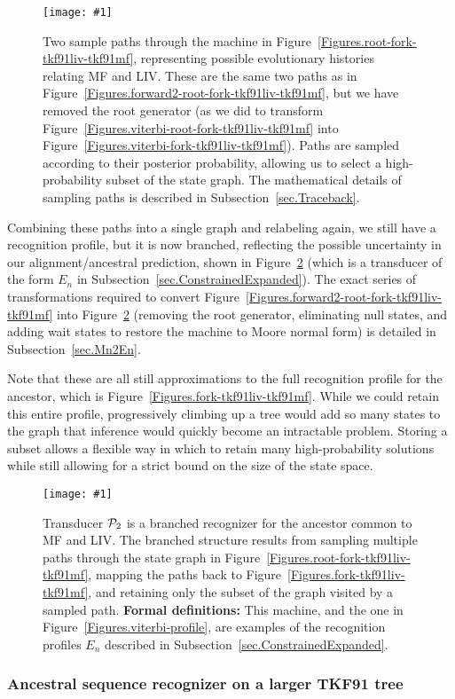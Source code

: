 \documentclass{article}
\newcommand{\secref}[1]{Subsection~\ref{sec.#1}}
\newcommand{\figref}[1]{Figure~\ref{Figures.#1}}
\newcommand{\figlabel}[1]{\label{Figures.#1}}
\newcommand{\easyfig}[4]{
\begin{figure}
\texttt{[image: \#1]}
\caption{ \figlabel{#3} #4}
\end{figure}}
\newcommand{\widepdffig}[2]{\easyfig{#1-fig.pdf}{width=\textwidth}{#1}{#2}}
\newcommand\profile{{\cal P}}
\newcommand\formaldefs{{\bf Formal definitions: }}
\begin{document}
\widepdffig{forward2-fork-tkf91liv-tkf91mf}{Two sample paths through the 
machine in \figref{root-fork-tkf91liv-tkf91mf}, representing
possible evolutionary histories relating MF and LIV.
These are the same two paths as in \figref{forward2-root-fork-tkf91liv-tkf91mf},
but we have removed the root generator (as we did to transform \figref{viterbi-root-fork-tkf91liv-tkf91mf} into \figref{viterbi-fork-tkf91liv-tkf91mf}).
Paths are sampled according to their posterior probability, 
allowing us to select a high-probability subset of the state graph.  
The mathematical details of sampling paths is described in \secref{Traceback}.}

Combining these paths into a single graph and relabeling again, 
we still have a recognition profile, but it is now branched,
reflecting the possible uncertainty in our alignment/ancestral prediction, shown in \figref{forward2-profile}
(which is a transducer of the form $E_n$ in \secref{ConstrainedExpanded}).
The exact series of transformations required to convert \figref{forward2-root-fork-tkf91liv-tkf91mf} into \figref{forward2-profile}
(removing the root generator, eliminating null states, and adding wait states to restore the machine to Moore normal form)
is detailed in \secref{Mn2En}.  

Note that these are all still approximations to the full
recognition profile for the ancestor, which is \figref{fork-tkf91liv-tkf91mf}.  
While we could retain this entire profile, progressively climbing up a tree
would add so many states to the graph that inference would quickly become an intractable
problem.  
Storing a subset allows a flexible way in which to retain many high-probability solutions
while still allowing for a strict bound on the size of the state space. 

\widepdffig{forward2-profile}{Transducer $\profile_2$ is a branched recognizer for the 
ancestor common to MF and LIV.  The branched structure results from sampling
multiple paths through the state graph in \figref{root-fork-tkf91liv-tkf91mf}, 
mapping the paths back to \figref{fork-tkf91liv-tkf91mf},
and retaining only the subset of the graph visited by a sampled path.
\formaldefs
This machine, and the one in \figref{viterbi-profile}, are examples of the recognition profiles $E_n$ described in \secref{ConstrainedExpanded}.  }

\subsubsection{Ancestral sequence recognizer on a larger TKF91 tree}
\end{document}
